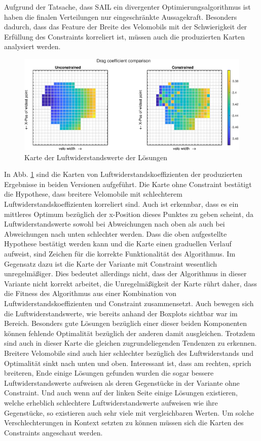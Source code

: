 Aufgrund der Tatsache, dass SAIL ein divergenter Optimierungsalgorithmus ist haben die finalen Verteilungen nur eingeschränkte Aussagekraft.
Besonders dadurch, dass das Feature der Breite des Velomobils mit der Schwierigkeit der Erfüllung des Constraints korreliert ist, müssen auch die produzierten Karten analysiert werden.

\begin{figure}[h]
	\includegraphics[width=1\linewidth]{bilder/2pt500Samples/dragMapComparison}
	\caption{Karte der Luftwiderstandswerte der Lösungen}
	\label{fig:1stmapDrag}
\end{figure}

In Abb. \cref{fig:1stmapDrag} sind die Karten von Luftwiderstandskoeffizienten der produzierten Ergebnisse in beiden Versionen aufgeführt.
Die Karte ohne Constraint bestätigt die Hypothese, dass breitere Velomobile mit schlechterem Luftwiderstandskoeffizienten korreliert sind.
Auch ist erkennbar, dass es ein mittleres Optimum bezüglich der x-Position dieses Punktes zu geben scheint, da Luftwiderstandswerte sowohl bei Abweichungen nach oben als auch bei Abweichungen nach unten schlechter werden.
Dass die oben aufgestellte Hypothese bestätigt werden kann und die Karte einen graduellen Verlauf aufweist, sind Zeichen für die korrekte Funktionalität des Algorithmus.
Im Gegensatz dazu ist die Karte der Variante mit Constraint wesentlich unregelmäßiger.
Dies bedeutet allerdings nicht, dass der Algorithmus in dieser Variante nicht korrekt arbeitet, die Unregelmäßigkeit der Karte rührt daher, dass die Fitness des Algorithmus aus einer Kombination von Luftwiderstandskoeffizienten und Constraint zusammensetzt.
Auch bewegen sich die Luftwiderstandswerte, wie bereits anhand der Boxplots sichtbar war im Bereich.
Besonders gute Lösungen bezüglich einer dieser beiden Komponenten können fehlende Optimalität bezüglich der anderen damit ausgleichen.
Trotzdem sind auch in dieser Karte die gleichen zugrundeliegenden Tendenzen zu erkennen.
Breitere Velomobile sind auch hier schlechter bezüglich des Luftwiderstands und Optimalität sinkt nach unten und oben.
Interessant ist, dass am rechten, sprich breiteren, Ende einige Lösungen gefunden wurden die sogar bessere Luftwiderstandswerte aufweisen als deren Gegenstücke in der Variante ohne Constraint.
Und auch wenn auf der linken Seite einige Lösungen existieren, welche erheblich schlechtere Luftwiderstandswerte aufweisen wie ihre Gegenstücke, so existieren auch sehr viele mit vergleichbaren Werten.
Um solche Verschlechterungen in Kontext setzten zu können müssen sich die Karten des Constraints angeschaut werden.

